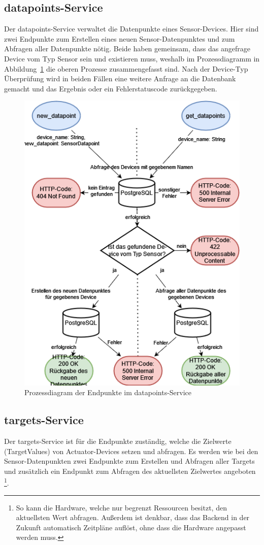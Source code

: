     \subsection{datapoints-Service}
        Der datapoints-Service verwaltet die Datenpunkte eines Sensor-Devices.
        Hier sind zwei Endpunkte zum Erstellen eines neuen Sensor-Datenpunktes und zum Abfragen aller Datenpunkte nötig.
        Beide haben gemeinsam, dass das angefrage Device vom Typ Sensor sein und existieren muss, weshalb im Prozessdiagramm in Abbildung~\ref{fig:backend-service-datapoints} die oberen Prozesse zusammengefasst sind.
        Nach der Device-Typ Überprüfung wird in beiden Fällen eine weitere Anfrage an die Datenbank gemacht und das Ergebnis oder ein Fehlerstatuscode zurückgegeben.
        \begin{figure}[H]
            \includegraphics[width=0.7\linewidth]{images/prozessdiagramm_backend_datapoints.drawio.png}
            \centering
            \caption{Prozessdiagram der Endpunkte im datapoints-Service}
            \label{fig:backend-service-datapoints}
        \end{figure}

    \subsection{targets-Service}
        Der targets-Service ist für die Endpunkte zuständig, welche die Zielwerte (TargetValues) von Actuator-Devices setzen und abfragen.
        Es werden wie bei den Sensor-Datenpunkten zwei Endpunkte zum Erstellen und Abfragen aller Targets und zusätzlich ein Endpunkt zum Abfragen des aktuellsten Zielwertes angeboten
        \footnote{ So kann die Hardware, welche nur begrenzt Ressourcen besitzt, den aktuellsten Wert abfragen. Außerdem ist denkbar, dass das Backend in der Zukunft automatisch Zeitpläne auflöst, ohne dass die Hardware angepasst werden muss. }.

